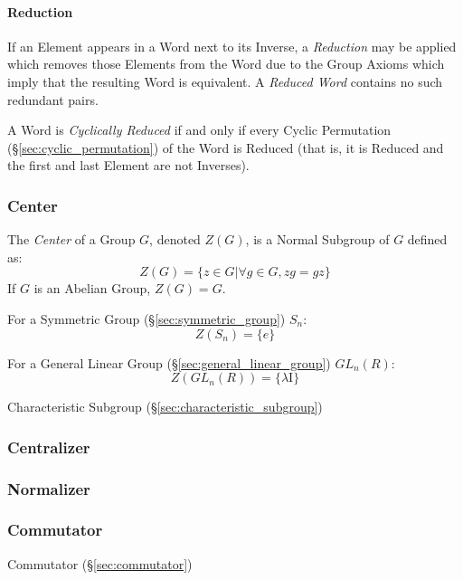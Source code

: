 \paragraph{Reduction}\label{sec:word_reduction}\hfill

If an Element appears in a Word next to its Inverse, a
\emph{Reduction} may be applied which removes those Elements from the
Word due to the Group Axioms which imply that the resulting Word is
equivalent. A \emph{Reduced Word} contains no such redundant pairs.

A Word is \emph{Cyclically Reduced} if and only if every Cyclic
Permutation (\S\ref{sec:cyclic_permutation}) of the Word is Reduced
(that is, it is Reduced and the first and last Element are not
Inverses).



\subsubsection{Center}\label{sec:group_center}

The \emph{Center} of a Group $G$, denoted $Z(G)$, is a Normal Subgroup
of $G$ defined as:
\[
    Z(G) = \{ z \in G | \forall g \in G, zg = gz \}
\]
If $G$ is an Abelian Group, $Z(G) = G$.

For a Symmetric Group (\S\ref{sec:symmetric_group}) $S_n$:
\[
    Z(S_n) = \{e\}
\]

For a General Linear Group (\S\ref{sec:general_linear_group})
$GL_n(R)$:
\[
    Z(GL_n(R)) = \{\lambda \mathrm{I}\}
\]

Characteristic Subgroup (\S\ref{sec:characteristic_subgroup})



\subsubsection{Centralizer}\label{sec:group_centralizer}

\subsubsection{Normalizer}\label{sec:group_normalizer}

\subsubsection{Commutator}\label{sec:group_commutator}

Commutator (\S\ref{sec:commutator})


